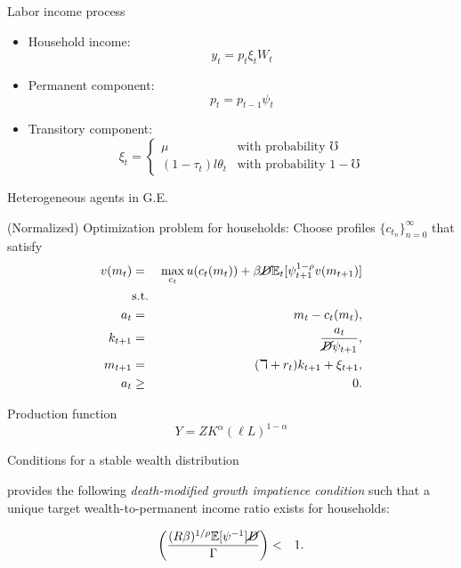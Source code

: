 \documentclass{beamer}
\begin{document}
\small
\begin{frame}{Labor income process}

\begin{itemize}
\item Household income: $$y_t = p_t \xi_t W_t$$
\item Permanent component: $$p_t = p_{t-1} \psi_t$$
\item Transitory component: $$\xi_t =
    \begin{cases}
       \mu & \text{with probability $\mho$} \\
      (1-\tau_t) l \theta_t & \text{with probability $1-\mho$}
   \end{cases}$$
\end{itemize}

\end{frame}

\footnotesize
\begin{frame}{Heterogeneous agents in G.E.}

(Normalized) Optimization problem for households: Choose profiles $\{c_{t_n}\}_{n=0}^{\infty}$ that satisfy
 \begin{eqnarray*}
  v(m_t) &=& \max_{c_t} u(c_t(m_t)) + \beta \cancel{D} \mathbb{E}_{t}[\psi_{t+1}^{1-\rho}v(m_{t+1})] \\
  &\text{s.t.}& \\
  a_t &=& m_t - c_t(m_t), \\
  k_{t+1} &=& \frac{a_t}{\cancel{D}\psi_{t+1}}, \\
  m_{t+1} &=& (\daleth + r_t)k_{t+1} + \xi_{t+1}, \\
  a_t &\geq& 0.
\end{eqnarray*}

Production function $$Y = Z K^{\alpha} (\ell L)^{1-\alpha}$$ 

\end{frame}


\begin{frame}{Conditions for a stable wealth distribution}

\cite{Carroll2019bst} provides the following \textit{death-modified growth impatience condition} such that a unique target wealth-to-permanent income ratio exists for households:

\begin{eqnarray*}
\left(\frac{(R \beta)^{1/ \rho}\mathbb{E}[\psi^{-1}]\cancel{D}}{\Gamma}\right) & < & 1.
\end{eqnarray*} 

\end{frame}
\end{document}
